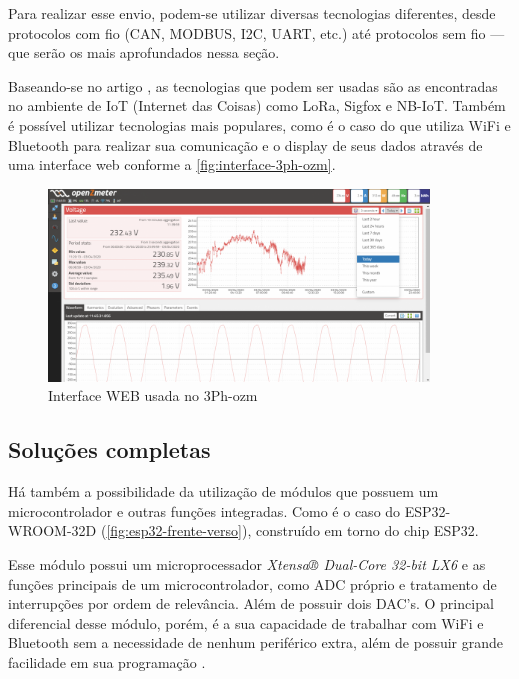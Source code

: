 Para realizar esse envio, podem-se utilizar diversas tecnologias diferentes, desde protocolos com fio (CAN, MODBUS, I2C, UART, etc.) até protocolos sem fio --- que serão os mais aprofundados nessa seção.

Baseando-se no artigo \citet{lowcost-smartmeter}, as tecnologias que podem ser usadas são as encontradas no ambiente de IoT (Internet das Coisas) como LoRa, Sigfox e NB-IoT. Também é possível utilizar tecnologias mais populares, como é o caso do \citet{3ph-ozm} que utiliza WiFi e Bluetooth para realizar sua comunicação e o display de seus dados através de uma interface web conforme a \autoref{fig:interface-3ph-ozm}.

\begin{figure}[htb!]
    \caption{Interface WEB usada no 3Ph-ozm}
    \label{fig:interface-3ph-ozm}
    \includegraphics[width=0.9\textwidth]{figuras/interface-web-openzmeter.png}
\end{figure}

\subsection{Soluções completas}\label{subsec:solucomp}

Há também a possibilidade da utilização de módulos que possuem um microcontrolador e outras funções integradas. Como é o caso do ESP32-WROOM-32D (\autoref{fig:esp32-frente-verso}), construído em torno do chip ESP32.

Esse módulo possui um microprocessador \textit{Xtensa® Dual-Core 32-bit LX6} e as funções principais de um microcontrolador, como \gls{ADC} próprio e tratamento de interrupções por ordem de relevância. Além de possuir dois \gls{DAC}'s. O principal diferencial desse módulo, porém, é a sua capacidade de trabalhar com WiFi e Bluetooth sem a necessidade de nenhum periférico extra, além de possuir grande facilidade em sua programação \cite{esp32-datasheet}.

